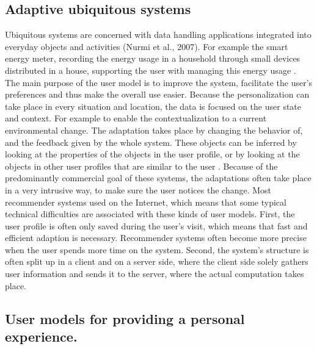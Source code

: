 \subsection{Adaptive ubiquitous systems}

Ubiquitous systems are concerned with data handling applications integrated into
everyday objects and activities (Nurmi et al., 2007).  For example the smart
energy meter, recording the energy usage in a household through small devices
distributed in a house, supporting the user with managing this energy
usage \cite{hargreaves2010making}.   
The main purpose of the user model is to
improve the system, facilitate the user’s preferences and thus make the overall
use easier.
Because the personalization can take place in every situation
and location, the data is focused on the user state and context. For example to
enable the contextualization to a current environmental change. 
The adaptation takes place by changing the behavior of, and the feedback given by the whole
system. These objects can be inferred by looking at the properties of the
objects in the user profile, or by looking at the objects in other user profiles
that are similar to the user \cite{kobsa2001generic} \cite{kay2012coming}. Because of the
predominantly commercial goal of these systems, the adaptations often take place
in a very intrusive way, to make sure the user notices the change.
Most recommender systems used on the Internet, which means that some typical
technical difficulties are associated with these kinds of user models. First,
the user profile is often only saved during the user’s visit,  which means that
fast and efficient adaption is necessary. Recommender systems often become more
precise when the user spends more time on the system. Second, the system’s
structure is often split up in a client and on a server side, where the client
side solely gathers user information and sends it to the server, where the
actual computation takes place.

\subsection{User models for providing a personal experience.}

